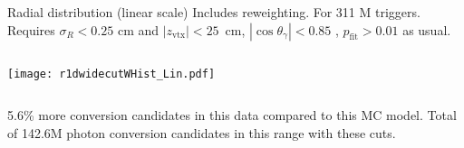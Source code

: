 \begin{frame}{Radial distribution (linear scale)}
Includes reweighting. For 311 M triggers. Requires $\sigma_{R} < 0.25$ cm and 
$|z_{\mathrm{vtx}}| < 25$~cm, $|\cos{\theta_{\gamma}}|<0.85$ , $p_{\mathrm{fit}}>0.01$ 
as usual.

\begin{columns}
\texttt{[image: r1dwidecutWHist\_Lin.pdf]}
\end{columns}
\newline
{\small 5.6\% more conversion candidates in this data compared to this MC model. 
Total of 142.6M photon conversion candidates in this range with these cuts.}
\end{frame}

